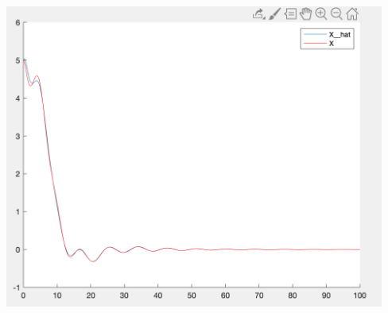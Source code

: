 \documentclass[a4paper,11pt]{article}
\theoremstyle{mytheor}
\begin{document}
\includegraphics[width=15cm, height=10cm]{J.png}
\end{document}
